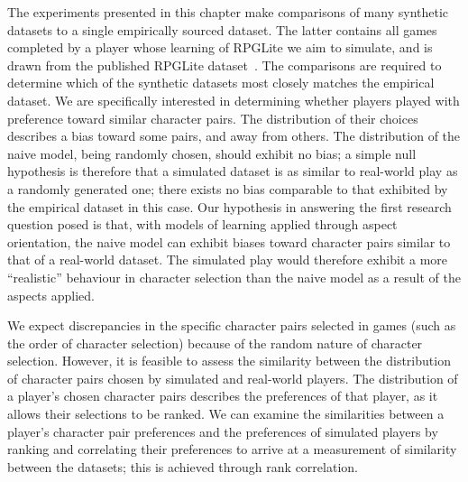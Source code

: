 The experiments presented in this chapter make comparisons of many synthetic
datasets to a single empirically sourced dataset. The latter contains all games
completed by a player whose learning of RPGLite we aim to simulate, and is drawn
from the published RPGLite dataset~\cite{rpglite_dataset}. The comparisons are
required to determine which of the synthetic datasets most closely matches the
empirical dataset. We are specifically interested in determining whether players
played with preference toward similar character pairs. The distribution of their
choices describes a bias toward some pairs, and away from others. The
distribution of the naive model, being randomly chosen, should exhibit no bias;
a simple null hypothesis is therefore that a simulated dataset is as similar to
real-world play as a randomly generated one; there exists no bias comparable to
that exhibited by the empirical dataset in this case. Our hypothesis in
answering the first research question posed is that, with models of learning
applied through aspect orientation, the naive model can exhibit biases toward
character pairs similar to that of a real-world dataset. The simulated play
would therefore exhibit a more ``realistic'' behaviour in character selection
than the naive model as a result of the aspects applied.


We expect discrepancies in the specific character pairs selected in games (such
as the order of character selection) because of the random nature of character
selection. However, it is feasible to assess the similarity between the
distribution of character pairs chosen by simulated and real-world players. The
distribution of a player's chosen character pairs describes the preferences of
that player, as it allows their selections to be ranked. We can examine the
similarities between a player's character pair preferences and the preferences
of simulated players by ranking and correlating their preferences to arrive at a
measurement of similarity between the datasets; this is achieved through
rank correlation.

